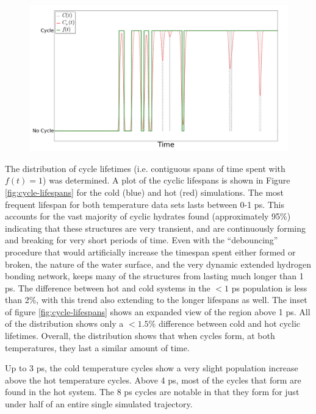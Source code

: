 \begin{figure}[h!]
	\begin{center}
		\includegraphics[scale=1.0]{images/cycles/cycle-debouncing-small.png}
		\caption{}
		\label{fig:debouncing}
	\end{center}
\end{figure}

The distribution of cycle lifetimes (i.e. contiguous spans of time spent with $f(t) = 1$) was determined. A plot of the cyclic lifespans is shown in Figure \ref{fig:cycle-lifespans} for the cold (blue) and hot (red) simulations. The most frequent lifespan for both temperature data sets lasts between 0-1 ps. This accounts for the vast majority of cyclic hydrates found (approximately 95\%) indicating that these structures are very transient, and are continuously forming and breaking for very short periods of time. Even with the ``debouncing'' procedure that would artificially increase the timespan spent either formed or broken, the nature of the water surface, and the very dynamic extended hydrogen bonding network, keeps many of the structures from lasting much longer than 1 ps. The difference between hot and cold systems in the $<1$ ps population is less than 2\%, with this trend also extending to the longer lifespans as well. The inset of figure \ref{fig:cycle-lifespans} shows an expanded view of the region above 1 ps. All of the distribution shows only a $<1.5$\% difference between cold and hot cyclic lifetimes. Overall, the distribution shows that when cycles form, at both temperatures, they last a similar amount of time. 

Up to 3 ps, the cold temperature cycles show a very slight population increase above the hot temperature cycles. Above 4 ps, most of the cycles that form are found in the hot system. The 8 ps cycles are notable in that they form  for just under half of an entire single simulated trajectory.

